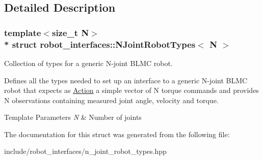 \subsection{Detailed Description}
\subsubsection*{template$<$size\+\_\+t N$>$\\*
struct robot\+\_\+interfaces\+::\+N\+Joint\+Robot\+Types$<$ N $>$}

Collection of types for a generic N-\/joint B\+L\+MC robot. 

Defines all the types needed to set up an interface to a generic N-\/joint B\+L\+MC robot that expects as \hyperlink{structrobot__interfaces_1_1NJointRobotTypes_1_1Action}{Action} a simple vector of N torque commands and provides N observations containing measured joint angle, velocity and torque.


\begin{DoxyTemplParams}{Template Parameters}
{\em N} & Number of joints \\
\hline
\end{DoxyTemplParams}


The documentation for this struct was generated from the following file\+:\begin{DoxyCompactItemize}
\item 
include/robot\+\_\+interfaces/n\+\_\+joint\+\_\+robot\+\_\+types.\+hpp\end{DoxyCompactItemize}
